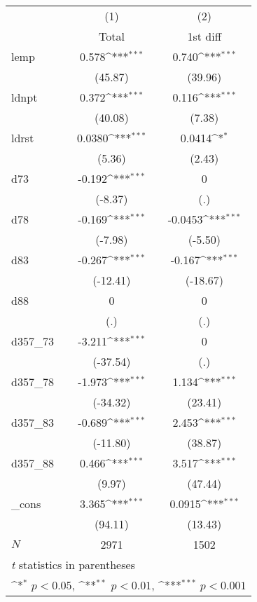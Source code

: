 {
\def\sym#1{\ifmmode^{#1}\else\(^{#1}\)\fi}
\begin{tabular}{l*{2}{c}}
\hline\hline
            &\multicolumn{1}{c}{(1)}&\multicolumn{1}{c}{(2)}\\
            &\multicolumn{1}{c}{Total}&\multicolumn{1}{c}{1st diff}\\
\hline
lemp        &       0.578\sym{***}&       0.740\sym{***}\\
            &     (45.87)         &     (39.96)         \\
[1em]
ldnpt       &       0.372\sym{***}&       0.116\sym{***}\\
            &     (40.08)         &      (7.38)         \\
[1em]
ldrst       &      0.0380\sym{***}&      0.0414\sym{*}  \\
            &      (5.36)         &      (2.43)         \\
[1em]
d73         &      -0.192\sym{***}&           0         \\
            &     (-8.37)         &         (.)         \\
[1em]
d78         &      -0.169\sym{***}&     -0.0453\sym{***}\\
            &     (-7.98)         &     (-5.50)         \\
[1em]
d83         &      -0.267\sym{***}&      -0.167\sym{***}\\
            &    (-12.41)         &    (-18.67)         \\
[1em]
d88         &           0         &           0         \\
            &         (.)         &         (.)         \\
[1em]
d357\_73     &      -3.211\sym{***}&           0         \\
            &    (-37.54)         &         (.)         \\
[1em]
d357\_78     &      -1.973\sym{***}&       1.134\sym{***}\\
            &    (-34.32)         &     (23.41)         \\
[1em]
d357\_83     &      -0.689\sym{***}&       2.453\sym{***}\\
            &    (-11.80)         &     (38.87)         \\
[1em]
d357\_88     &       0.466\sym{***}&       3.517\sym{***}\\
            &      (9.97)         &     (47.44)         \\
[1em]
\_cons      &       3.365\sym{***}&      0.0915\sym{***}\\
            &     (94.11)         &     (13.43)         \\
\hline
\(N\)       &        2971         &        1502         \\
\hline\hline
\multicolumn{3}{l}{\footnotesize \textit{t} statistics in parentheses}\\
\multicolumn{3}{l}{\footnotesize \sym{*} \(p<0.05\), \sym{**} \(p<0.01\), \sym{***} \(p<0.001\)}\\
\end{tabular}
}

